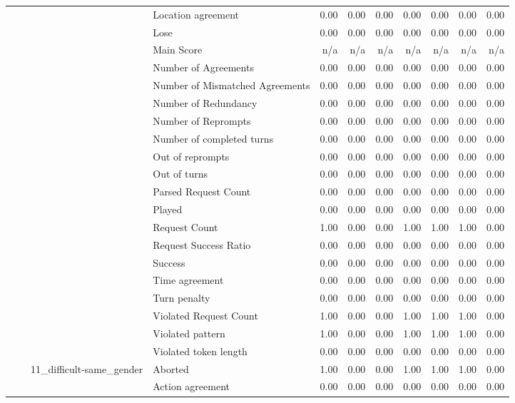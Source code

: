 \begin{tabular}{llllrrrrrrr}
 &  &  & Location agreement & 0.00 & 0.00 & 0.00 & 0.00 & 0.00 & 0.00 & 0.00 \\
 &  &  & Lose & 0.00 & 0.00 & 0.00 & 0.00 & 0.00 & 0.00 & 0.00 \\
 &  &  & Main Score & n/a & n/a & n/a & n/a & n/a & n/a & n/a \\
 &  &  & Number of Agreements & 0.00 & 0.00 & 0.00 & 0.00 & 0.00 & 0.00 & 0.00 \\
 &  &  & Number of Mismatched Agreements & 0.00 & 0.00 & 0.00 & 0.00 & 0.00 & 0.00 & 0.00 \\
 &  &  & Number of Redundancy & 0.00 & 0.00 & 0.00 & 0.00 & 0.00 & 0.00 & 0.00 \\
 &  &  & Number of Reprompts & 0.00 & 0.00 & 0.00 & 0.00 & 0.00 & 0.00 & 0.00 \\
 &  &  & Number of completed turns & 0.00 & 0.00 & 0.00 & 0.00 & 0.00 & 0.00 & 0.00 \\
 &  &  & Out of reprompts & 0.00 & 0.00 & 0.00 & 0.00 & 0.00 & 0.00 & 0.00 \\
 &  &  & Out of turns & 0.00 & 0.00 & 0.00 & 0.00 & 0.00 & 0.00 & 0.00 \\
 &  &  & Parsed Request Count & 0.00 & 0.00 & 0.00 & 0.00 & 0.00 & 0.00 & 0.00 \\
 &  &  & Played & 0.00 & 0.00 & 0.00 & 0.00 & 0.00 & 0.00 & 0.00 \\
 &  &  & Request Count & 1.00 & 0.00 & 0.00 & 1.00 & 1.00 & 1.00 & 0.00 \\
 &  &  & Request Success Ratio & 0.00 & 0.00 & 0.00 & 0.00 & 0.00 & 0.00 & 0.00 \\
 &  &  & Success & 0.00 & 0.00 & 0.00 & 0.00 & 0.00 & 0.00 & 0.00 \\
 &  &  & Time agreement & 0.00 & 0.00 & 0.00 & 0.00 & 0.00 & 0.00 & 0.00 \\
 &  &  & Turn penalty & 0.00 & 0.00 & 0.00 & 0.00 & 0.00 & 0.00 & 0.00 \\
 &  &  & Violated Request Count & 1.00 & 0.00 & 0.00 & 1.00 & 1.00 & 1.00 & 0.00 \\
 &  &  & Violated pattern & 1.00 & 0.00 & 0.00 & 1.00 & 1.00 & 1.00 & 0.00 \\
 &  &  & Violated token length & 0.00 & 0.00 & 0.00 & 0.00 & 0.00 & 0.00 & 0.00 \\
\cline{3-11}
 &  & \multirow[t]{27}{*}{11_difficult-same_gender} & Aborted & 1.00 & 0.00 & 0.00 & 1.00 & 1.00 & 1.00 & 0.00 \\
 &  &  & Action agreement & 0.00 & 0.00 & 0.00 & 0.00 & 0.00 & 0.00 & 0.00 \\

\end{tabular}
